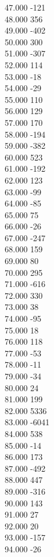 { 47.000	-121 \\
 48.000	356 \\
 49.000	-402 \\
 50.000	300 \\
 51.000	-307 \\
 52.000	114 \\
 53.000	-18 \\
 54.000	-29 \\
 55.000	110 \\
 56.000	129 \\
 57.000	170 \\
 58.000	-194 \\
 59.000	-382 \\
 60.000	523 \\
 61.000	-192 \\
 62.000	123 \\
 63.000	-99 \\
 64.000	-85 \\
 65.000	75 \\
 66.000	-26 \\
 67.000	-247 \\
 68.000	159 \\
 69.000	80 \\
 70.000	295 \\
 71.000	-616 \\
 72.000	330 \\
 73.000	38 \\
 74.000	-95 \\
 75.000	18 \\
 76.000	118 \\
 77.000	-53 \\
 78.000	-11 \\
 79.000	-34 \\
 80.000	24 \\
 81.000	199 \\
 82.000	5336 \\
 83.000	-6041 \\
 84.000	538 \\
 85.000	-14 \\
 86.000	173 \\
 87.000	-492 \\
 88.000	447 \\
 89.000	-316 \\
 90.000	143 \\
 91.000	27 \\
 92.000	20 \\
 93.000	-157 \\
 94.000	-26 \\
}
